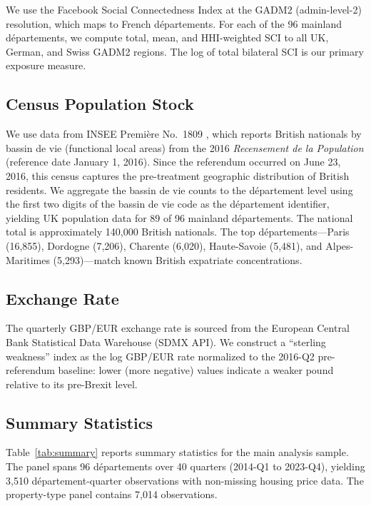 \documentclass[12pt]{article}
\begin{document}
We use the Facebook Social Connectedness Index at the GADM2 (admin-level-2) resolution, which maps to French d\'epartements. For each of the 96 mainland d\'epartements, we compute total, mean, and HHI-weighted SCI to all UK, German, and Swiss GADM2 regions. The log of total bilateral SCI is our primary exposure measure.

\subsection{Census Population Stock}

We use data from INSEE Premi\`ere No.\ 1809 \citep{insee2019premiere}, which reports British nationals by bassin de vie (functional local areas) from the 2016 \textit{Recensement de la Population} (reference date January 1, 2016). Since the referendum occurred on June 23, 2016, this census captures the pre-treatment geographic distribution of British residents. We aggregate the bassin de vie counts to the d\'epartement level using the first two digits of the bassin de vie code as the d\'epartement identifier, yielding UK population data for 89 of 96 mainland d\'epartements. The national total is approximately 140,000 British nationals. The top d\'epartements---Paris (16,855), Dordogne (7,206), Charente (6,020), Haute-Savoie (5,481), and Alpes-Maritimes (5,293)---match known British expatriate concentrations.

\subsection{Exchange Rate}

The quarterly GBP/EUR exchange rate is sourced from the European Central Bank Statistical Data Warehouse (SDMX API). We construct a ``sterling weakness'' index as the log GBP/EUR rate normalized to the 2016-Q2 pre-referendum baseline: lower (more negative) values indicate a weaker pound relative to its pre-Brexit level.

\subsection{Summary Statistics}

Table~\ref{tab:summary} reports summary statistics for the main analysis sample. The panel spans 96 d\'epartements over 40 quarters (2014-Q1 to 2023-Q4), yielding 3,510 d\'epartement-quarter observations with non-missing housing price data. The property-type panel contains 7,014 observations.
\end{document}
